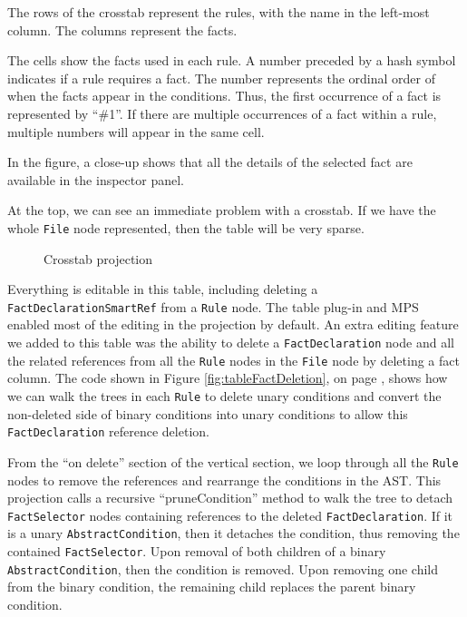 The rows of the crosstab represent the rules, with the name in the left-most column.
The columns represent the facts.

The cells show the facts used in each rule.
A number preceded by a hash symbol indicates if a rule requires a fact.
The number represents the ordinal order of when the facts appear in the conditions.
Thus, the first occurrence of a fact is represented by ``\#1''.
If there are multiple occurrences of a fact within a rule, multiple numbers will appear in the same cell.

In the figure, a close-up shows that all the details of the selected fact are available in the inspector panel.

At the top, we can see an immediate problem with a crosstab.
If we have the whole \texttt{File} node represented, then the table will be very sparse.

\begin{figure}
    \centering
    \caption{Crosstab projection}
    \label{fig:crosstabProjection1}
\end{figure}

Everything is editable in this table, including deleting a \texttt{FactDeclarationSmartRef} from a \texttt{Rule} node.
The table plug-in and MPS enabled most of the editing in the projection by default.
An extra editing feature we added to this table was the ability to delete a \texttt{FactDeclaration} node and all the related references from all the \texttt{Rule} nodes in the \texttt{File} node by deleting a fact column.
The code shown in Figure \ref{fig:tableFactDeletion}, on page \pageref{fig:tableFactDeletion}, shows how we can walk the trees in each \texttt{Rule} to delete unary conditions and convert the non-deleted side of binary conditions into unary conditions to allow this \texttt{FactDeclaration} reference deletion.

From the ``on delete'' section of the vertical section, we loop through all the \texttt{Rule} nodes to remove the references and rearrange the conditions in the AST.
This projection calls a recursive ``pruneCondition'' method to walk the tree to detach \texttt{FactSelector} nodes containing references to the deleted \texttt{FactDeclaration}.
If it is a unary \texttt{AbstractCondition}, then it detaches the condition, thus removing the contained \texttt{FactSelector}.
Upon removal of both children of a binary \texttt{AbstractCondition}, then the condition is removed.
Upon removing one child from the binary condition, the remaining child replaces the parent binary condition.

